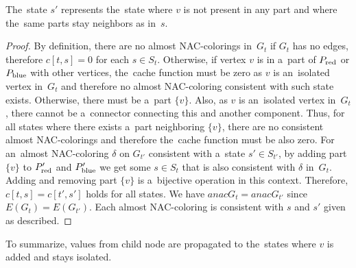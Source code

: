 \newpage
{}
%
The~state \( s' \) represents the~state where \( v \) is not present in any part
and where the~same parts stay neighbors as in~\( s \).
%
\begin{proof}
	By definition, there are no almost NAC-colorings
	in~\( G_t \) if \( G_t \) has no edges,
	therefore \( c[t, s] = 0 \) for each \( s \in S_t \).
	Otherwise, if vertex \( v \) is in a~part of \( P_{\text{red}} \) or \( P_{\text{blue}} \) with other vertices,
	the~cache function must be zero as \( v \) is an~isolated vertex in~\( G_t \)
	and therefore no almost NAC-coloring consistent with such state exists.
	Otherwise, there must be a~part \( \{v\} \).
	Also, as \( v \) is an~isolated vertex in~\( G_t \), there cannot be a~connector
	connecting this and another component.
	Thus, for all states where there exists
	a~part neighboring \( \{v\} \), there are no consistent almost NAC-colorings
	and therefore the~cache function must be also zero.
	For an~almost NAC-coloring \( \delta \) on \( G_{t'} \) consistent with
	a~state \( s' \in S_{t'} \),
	by adding part \( \{v\} \) to \( P_{\text{red}}' \) and \( P_{\text{blue}}' \)
	we get some \( s \in S_t \) that is also consistent with \( \delta \) in~\( G_t \).
	Adding and removing part \( \{v\} \) is a~bijective operation in this context.
	Therefore, \( c[t, s] = c[t', s'] \) holds for all states.
	We have \( anac{G_t} = anac{G_{t'}} \) since \( E(G_t) = E(G_{t'}) \).
	Each almost NAC-coloring is consistent
	with \( s \) and \( s' \) given as described.
\end{proof}
%
To summarize, values from child node are propagated to the~states
where \( v \) is added and stays isolated.

